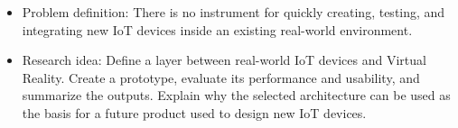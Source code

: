 \begin{itemize}
    \item Problem definition: There is no instrument for quickly creating, testing, and integrating new IoT devices inside an existing real-world environment.  
    \item Research idea: Define a layer between real-world IoT devices and Virtual Reality. Create a prototype, evaluate its performance and usability, and summarize the outputs. Explain why the selected architecture can be used as the basis for a future product used to design new IoT devices.
\end{itemize}











